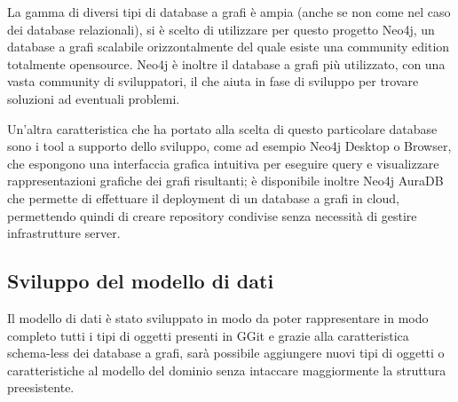 La gamma di diversi tipi di database a grafi è ampia (anche se non come nel caso dei database relazionali), si è scelto di utilizzare per questo progetto Neo4j, un database a grafi scalabile orizzontalmente del quale esiste una community edition totalmente opensource\cite{neo4jgit}. Neo4j è inoltre il database a grafi più utilizzato\cite{db-engines_2022}, con una vasta community di sviluppatori, il che aiuta in fase di sviluppo per trovare soluzioni ad eventuali problemi.

Un'altra caratteristica che ha portato alla scelta di questo particolare database sono i tool a supporto dello sviluppo, come ad esempio Neo4j Desktop o Browser, che espongono una interfaccia grafica intuitiva per eseguire query e visualizzare rappresentazioni grafiche dei grafi risultanti; è disponibile inoltre Neo4j AuraDB che permette di effettuare il deployment di un database a grafi in cloud, permettendo quindi di creare repository condivise senza necessità di gestire infrastrutture server.

\subsection{Sviluppo del modello di dati}
\label{sec:datamodel}
Il modello di dati è stato sviluppato in modo da poter rappresentare in modo completo tutti i tipi di oggetti presenti in GGit e grazie alla caratteristica schema-less dei database a grafi, sarà possibile aggiungere nuovi tipi di oggetti o caratteristiche al modello del dominio senza intaccare maggiormente la struttura preesistente.

